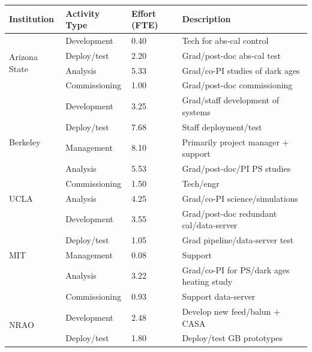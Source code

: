 \documentclass[preprint]{aastex}
\begin{document}
\begin{table}[htb]
\begin{tabular}{| p{1in} | p{1in} | p{0.5in} | p{3in} |} \hline
\textbf{Institution}  &  \textbf{Activity Type}  &  \textbf{Effort (FTE)} & \textbf{Description} \\ \hline
\multirow{4}{*}{Arizona State} & Development    & 0.40 & Tech for abs-cal control \\ 
                                                & Deploy/test       & 2.20 & Grad/post-doc abs-cal test\\
                                                & Analysis      & 5.33   & Grad/co-PI studies of dark ages \\ 
                                                & Commissioning & 1.00  & Grad/post-doc commissioning \\ \hline
\multirow{5}{*}{Berkeley}         & Development    & 3.25  & Grad/staff development of systems \\ 
                                                & Deploy/test      & 7.68  & Staff deployment/test \\ 
                                                & Management  & 8.10  & Primarily project manager + support \\
                                                &  Analysis     & 5.53   & Grad/post-doc/PI PS studies \\ 
                                                & Commissioning  & 1.50 & Tech/engr  \\ \hline
\multirow{1}{*}{UCLA}             & Analysis   & 4.25  & Grad/co-PI science/simulations  \\  \hline
\multirow{5}{*}{MIT}                 & Development & 3.55 & Grad/post-doc redundant cal/data-server \\
                                                & Deploy/test   & 1.05 & Grad pipeline/data-server test \\
                                                & Management  & 0.08 & Support \\
                                                & Analysis         & 3.22 & Grad/co-PI for PS/dark ages heating study \\ 
                                                & Commissioning  & 0.93  & Support data-server\\ \hline
\multirow{5}{*}{NRAO}            & Development & 2.48 & Develop new feed/balun + CASA \\ 
                                                & Deploy/test   & 1.80  & Deploy/test GB prototypes \\ 

\end{tabular}
\end{table}
\end{document}
